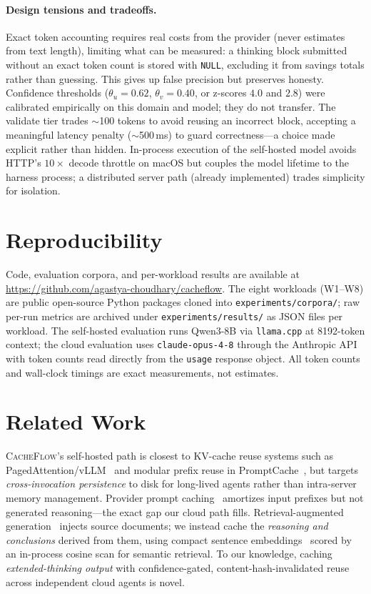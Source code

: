 \documentclass[10pt]{article}
\begin{document}
\paragraph{Design tensions and tradeoffs.}
Exact token accounting requires real costs from the provider (never estimates
from text length), limiting what can be measured: a thinking block submitted
without an exact token count is stored with \texttt{NULL}, excluding it from
savings totals rather than guessing. This gives up false precision but preserves
honesty. Confidence thresholds ($\theta_u = 0.62$, $\theta_v = 0.40$, or
z-scores $4.0$ and $2.8$) were calibrated empirically on this domain and model;
they do not transfer. The validate tier trades $\sim$100 tokens to avoid reusing
an incorrect block, accepting a meaningful latency penalty ($\sim$500\,ms) to
guard correctness---a choice made explicit rather than hidden. In-process
execution of the self-hosted model avoids HTTP's $10\times$ decode throttle on
macOS but couples the model lifetime to the harness process; a distributed
server path (already implemented) trades simplicity for isolation.

\section{Reproducibility}
\label{sec:repro}

Code, evaluation corpora, and per-workload results are available at
\url{https://github.com/agastya-choudhary/cacheflow}. The eight workloads
(W1--W8) are public open-source Python packages cloned into
\texttt{experiments/corpora/}; raw per-run metrics are archived under
\texttt{experiments/results/} as JSON files per workload. The self-hosted
evaluation runs Qwen3-8B via \texttt{llama.cpp} at \num{8192}-token context; the
cloud evaluation uses \texttt{claude-opus-4-8} through the Anthropic API with
token counts read directly from the \texttt{usage} response object. All token
counts and wall-clock timings are exact measurements, not estimates.

\section{Related Work}
\label{sec:related}

\textsc{CacheFlow}'s self-hosted path is closest to KV-cache reuse systems such
as PagedAttention/vLLM~\cite{pagedattention} and modular prefix reuse in
PromptCache~\cite{promptcache}, but targets \emph{cross-invocation persistence}
to disk for long-lived agents rather than intra-server memory management.
Provider prompt caching~\cite{anthropic-caching} amortizes input prefixes but
not generated reasoning---the exact gap our cloud path fills. Retrieval-augmented
generation~\cite{rag} injects source documents; we instead cache the
\emph{reasoning and conclusions} derived from them, using compact
sentence embeddings~\cite{minilm} scored by an in-process cosine scan for
semantic retrieval. To our knowledge, caching \emph{extended-thinking output}
with confidence-gated, content-hash-invalidated reuse across independent cloud
agents is novel.
\end{document}
